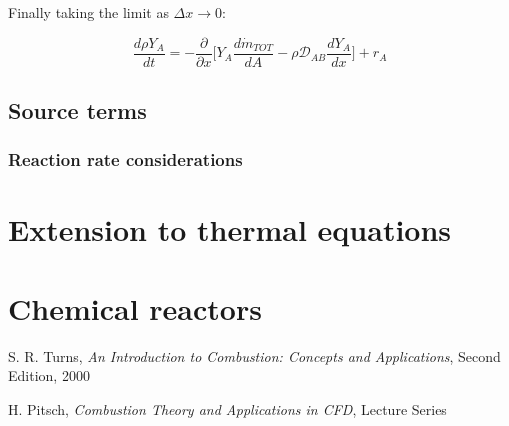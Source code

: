 \documentclass[10pt,twocolumn]{article}
\begin{document}
Finally taking the limit as $\Delta x \rightarrow 0$:

\begin{equation}
\frac{d \rho Y_{A} }{dt} = - \frac{\partial}{\partial x}\Big[ Y_A \frac{d \dot{m}_{TOT}}{d A} - \rho \mathcal{D}_{AB} \frac{dY_A}{dx} \Big] + r_A
\end{equation}

\subsection{Source terms}



\subsubsection{Reaction rate considerations}











\section{Extension to thermal equations}




\section{Chemical reactors}








\thebibliography{}

 S. R. Turns, \textit{An Introduction to Combustion: Concepts and Applications}, Second Edition, 2000 \label{bib:turns}

 H. Pitsch, \textit{Combustion Theory and Applications in CFD}, Lecture Series \label{bib:pitsch}


 \label{bib:pope}
\end{document}
